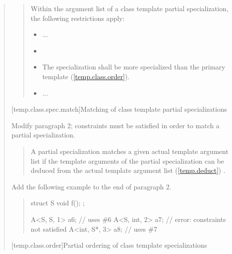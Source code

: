 \begin{quote}
\begin{quote}
\setcounter{Paras}{7}
Within the argument list of a class template partial specialization, 
the following restrictions apply:
\begin{itemize}
\item ...

\item {}

\item The specialization shall be more specialized than the primary
template (\ref{temp.class.order}).

\item ...
\end{itemize}
\end{quote}
 
[temp.class.spec.match]{Matching of class template partial specializations}

Modify paragraph 2; constraints must be satisfied in order
to match a partial specialization. 

\begin{quote}
\setcounter{Paras}{1}
\pnum
A partial specialization matches a given actual template argument list if 
the template arguments of the partial specialization can be deduced from the 
actual template argument list (\ref{temp.deduct}) .
\end{quote}

Add the following example to the end of paragraph 2.

\begin{quote}
\begin{addedblock}
\enterexample
\begin{codeblock}
struct S { void f(); };

A<S, S, 1>    a6; // uses \#6
A<S, int, 2>  a7; // error: constraints not satisfied
A<int, S*, 3> a8; // uses \#7
\end{codeblock}
\exitexample
\end{addedblock}
\end{quote}


[temp.class.order]{Partial ordering of class template specializations}


\end{quote}
